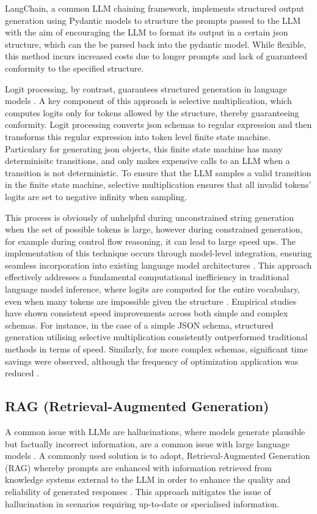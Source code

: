 \documentclass[a4paper, oneside]{discothesis}
\begin{document}
LangChain, a common LLM chaining framework, implements structured output generation using Pydantic models to structure the prompts passed to the LLM with the aim of encouraging the LLM to format its output in a certain json structure, which can the be parsed back into the pydantic model. While flexible, this method incurs increased costs due to longer prompts and lack of guaranteed conformity to the specified structure.

Logit processing, by contrast, guarantees structured generation in language models \cite{chaudhari2023logit}. A key component of this approach is selective multiplication, which computes logits only for tokens allowed by the structure, thereby guaranteeing conformity. Logit processing converts json schemas to regular expression and then transforms this regular expression into token level finite state machine. Particulary for generating json objects, this finite state machine has many determinisitc transitions, and only makes expensive calls to an LLM when a transition is not deterministic. To ensure that the LLM samples a valid transition in the finite state machine, selective multiplication ensures that all invalid tokens' logits are set to negative infinity when sampling.

This process is obviously of unhelpful during unconstrained string generation when the set of possible tokens is large, however during constrained generation, for example during control flow reasoning, it can lead to large speed ups. The implementation of this technique occurs through model-level integration, ensuring seamless incorporation into existing language model architectures \cite{chaudhari2023logit}. This approach effectively addresses a fundamental computational inefficiency in traditional language model inference, where logits are computed for the entire vocabulary, even when many tokens are impossible given the structure \cite{willard2023efficient}. Empirical studies have shown consistent speed improvements across both simple and complex schemas. For instance, in the case of a simple JSON schema, structured generation utilising selective multiplication consistently outperformed traditional methods in terms of speed. Similarly, for more complex schemas, significant time savings were observed, although the frequency of optimization application was reduced \cite{chaudhari2023logit}.

\subsection{RAG (Retrieval-Augmented Generation)}
A common issue with LLMs are hallucinations, where models generate plausible but factually incorrect information, are a common issue with large language models \cite{maynez2020faithfulness}. A commonly used solution is to adopt, Retrieval-Augmented Generation (RAG) whereby prompts are enhanced with information retrieved from knowledge systems external to the LLM in order to enhance the quality and reliability of generated responses \cite{lewis2020retrieval}. This approach mitigates the issue of hallucination in scenarios requiring up-to-date or specialised information.
\end{document}
